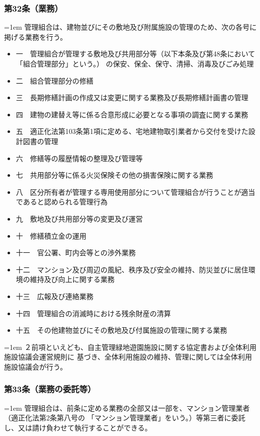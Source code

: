 \documentclass[
  twoside,
  luatex,
  paper=a4paper,
  fontsize=11pt,
  jafontsize=11pt,
  jlreq_notes,
]{jlreq}
\newcommand{\joumain}[1]{%
  \noindent\hangindent=1em\hangafter=1
  \hspace{1em}#1%
}
\newcommand{\kou}[2]{%
  \par\noindent\hangindent=1em\hangafter=1
  #1\hspace{1em}#2%
}
\begin{document}
  \subsubsection*{第32条（業務）}
  \joumain{管理組合は、建物並びにその敷地及び附属施設の管理のため、次の各号に掲げる業務を行う。}
  \begin{itemize}[label={}, leftmargin=3em, itemindent=-2em]
    \item 一　管理組合が管理する敷地及び共用部分等（以下本条及び第48条において「組合管理部分」という。）
          の保安、保全、保守、清掃、消毒及びごみ処理
    \item 二　組合管理部分の修繕
    \item 三　長期修繕計画の作成又は変更に関する業務及び長期修繕計画書の管理
    \item 四　建物の建替え等に係る合意形成に必要となる事項の調査に関する業務
    \item 五　適正化法第103条第1項に定める、宅地建物取引業者から交付を受けた設計図書の管理
    \item 六　修繕等の履歴情報の整理及び管理等
    \item 七　共用部分等に係る火災保険その他の損害保険に関する業務
    \item 八　区分所有者が管理する専用使用部分について管理組合が行うことが適当であると認められる管理行為
    \item 九　敷地及び共用部分等の変更及び運営
    \item 十　修繕積立金の運用
    \item 十一　官公署、町内会等との渉外業務
    \item 十二　マンション及び周辺の風紀、秩序及び安全の維持、防災並びに居住環境の維持及び向上に関する業務
    \item 十三　広報及び連絡業務
    \item 十四　管理組合の消滅時における残余財産の清算
    \item 十五　その他建物並びにその敷地及び付属施設の管理に関する業務
  \end{itemize}
  \kou{２}{前項といえども、自主管理緑地遊園施設に関する協定書および全体利用施設協議会運営規則に
  基づき、全体利用施設の維持、管理に関しては全体利用施設協議会が行う。}

  \subsubsection*{第33条（業務の委託等）}
  \joumain{管理組合は、前条に定める業務の全部又は一部を、マンション管理業者（適正化法第2条第八号の
  「マンション管理業者」をいう。）等第三者に委託し、又は請け負わせて執行することができる。}
\end{document}
